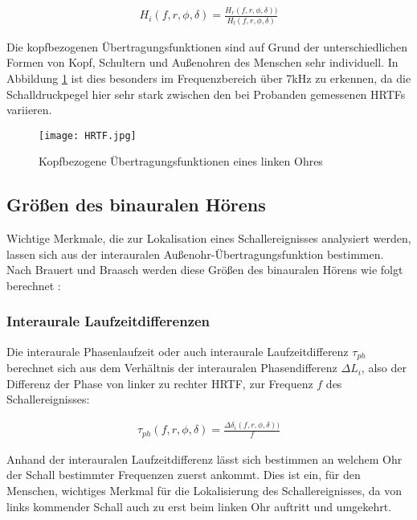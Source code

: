 \begin{align}
H_i(f,r,\phi,\delta) = \frac{H_r(f,r,\phi,\delta))}{H_l(f,r,\phi,\delta)}
\end{align}

 Die kopfbezogenen Übertragungsfunktionen sind auf Grund der unterschiedlichen Formen von Kopf, Schultern und Außenohren des Menschen sehr individuell. In Abbildung \ref{fig:HRTF} ist dies besonders im Frequenzbereich über 7kHz zu erkennen, da die Schalldruckpegel hier sehr stark zwischen den bei Probanden gemessenen HRTFs variieren. 

\begin{figure}[H]
\centering
\texttt{[image: HRTF.jpg]}
\caption{Kopfbezogene Übertragungsfunktionen eines linken Ohres}

\label{fig:HRTF}
\end{figure}

\subsection{Größen des binauralen Hörens}
Wichtige Merkmale, die zur Lokalisation eines Schallereignisses analysiert werden, lassen sich aus der interauralen Außenohr-Übertragungsfunktion bestimmen. 
Nach Brauert und Braasch werden diese Größen des binauralen Hörens wie folgt berechnet \cite[S.91]{HdA08}:

\subsubsection{Interaurale Laufzeitdifferenzen}
Die interaurale Phasenlaufzeit oder auch interaurale Laufzeitdifferenz $\tau_{ph}$ berechnet sich aus dem Verhältnis der interauralen Phasendifferenz $\Delta L_i$, also der Differenz der Phase von linker zu rechter HRTF, zur Frequenz $f$ des Schallereignisses: 

\begin{align}
\tau_{ph}(f,r,\phi,\delta) = \frac{\Delta\delta_i(f,r,\phi,\delta))}{f}
\end{align}

Anhand der interauralen Laufzeitdifferenz lässt sich bestimmen an welchem Ohr der Schall bestimmter Frequenzen zuerst ankommt. Dies ist ein, für den Menschen,  wichtiges Merkmal für die Lokalisierung des Schallereignisses, da von links kommender Schall auch zu erst beim linken Ohr auftritt und umgekehrt. 

